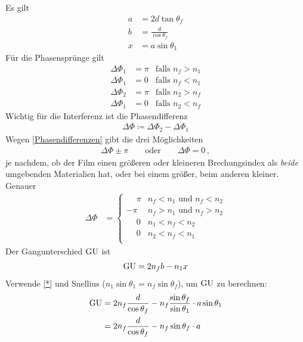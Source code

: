 \begin{enumerate}[a)]
  Es gilt
  \begin{align}\label{*}
    a &= 2d\tan\theta_f \\\nonumber
    b &= \frac{d}{\cos\theta_f}\\\nonumber
    x &= a\sin\theta_1
  \end{align}
  Für die Phasensprünge gilt
  \begin{align}\label{Phasendifferenzen}
    \Delta\Phi_1 &= \pi &\text{falls } n_f>n_1\\\nonumber
    \Delta\Phi_1 &= 0   &\text{falls } n_f<n_1\\\nonumber
    \Delta\Phi_2 &= \pi &\text{falls } n_2>n_f\\\nonumber
    \Delta\Phi_1 &= 0   &\text{falls } n_2<n_f
  \end{align}
  Wichtig für die Interferenz ist die Phasendifferenz
  \begin{gather*}
    \Delta\Phi \coloneqq \Delta\Phi_2 - \Delta\Phi_1
  \end{gather*}
  Wegen \eqref{Phasendifferenzen} gibt die drei Möglichkeiten
  \begin{gather*}
    \Delta\Phi \pm \pi  
    \qquad\text{oder}\qquad 
    \Delta\Phi = 0\,,
  \end{gather*}
  je nachdem, ob der Film einen größeren oder
  kleineren Brechungsindex als \emph{beide} umgebenden Materialien hat,
  oder bei einem größer, beim anderen kleiner. Genauer
  \begin{align*}
    \Delta\Phi 
    &=
      \begin{cases}
        \phantom{-}\pi & n_f<n_1\text{ und }n_f<n_2\\
        -\pi           & n_f>n_1\text{ und }n_f>n_2\\
        \phantom{-}0   & n_1<n_f<n_2\\ 
        \phantom{-}0   & n_2<n_f<n_1\\
      \end{cases}
  \end{align*}
  Der Gangunterschied $\operatorname{GU}$ ist
  \begin{gather*}
    \operatorname{GU} = 2n_f b - n_1x 
  \end{gather*}
  Verwende \eqref{*} und Snellius ($n_1\sin\theta_1 = n_f\sin\theta_f$),
  um $\operatorname{GU}$ zu berechnen:
  \begin{align*}
    \GU &= 2 n_f\frac{d}{\cos\theta_f} 
          - n_f\frac{\sin\theta_f}{\sin\theta_1} \cdot a\sin\theta_1\\
        &= 2 n_f\frac{d}{\cos\theta_f} - n_f\sin\theta_f \cdot a\\

\end{align*}
\end{enumerate}
